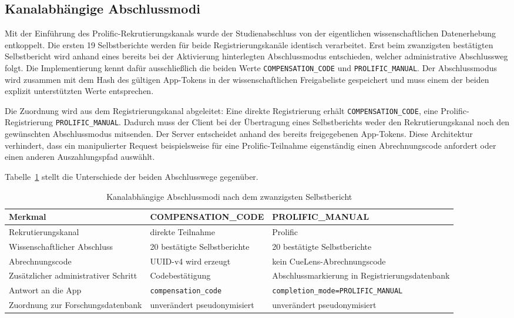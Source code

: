 
\begin{neu}
\section{Kanalabhängige Abschlussmodi}

Mit der Einführung des Prolific-Rekrutierungskanals wurde der Studienabschluss von der eigentlichen wissenschaftlichen Datenerhebung entkoppelt. Die ersten 19 Selbstberichte werden für beide Registrierungskanäle identisch verarbeitet. Erst beim zwanzigsten bestätigten Selbstbericht wird anhand eines bereits bei der Aktivierung hinterlegten Abschlussmodus entschieden, welcher administrative Abschlussweg folgt. Die Implementierung kennt dafür ausschließlich die beiden Werte \texttt{COMPENSATION\_CODE} und \texttt{PROLIFIC\_MANUAL}. Der Abschlussmodus wird zusammen mit dem Hash des gültigen App-Tokens in der wissenschaftlichen Freigabeliste gespeichert und muss einem der beiden explizit unterstützten Werte entsprechen.

Die Zuordnung wird aus dem Registrierungskanal abgeleitet: Eine direkte Registrierung erhält \texttt{COMPENSATION\_CODE}, eine Prolific-Registrierung \texttt{PROLIFIC\_MANUAL}. Dadurch muss der Client bei der Übertragung eines Selbstberichts weder den Rekrutierungskanal noch den gewünschten Abschlussmodus mitsenden. Der Server entscheidet anhand des bereits freigegebenen App-Tokens. Diese Architektur verhindert, dass ein manipulierter Request beispielsweise für eine Prolific-Teilnahme eigenständig einen Abrechnungscode anfordert oder einen anderen Auszahlungspfad auswählt.

Tabelle~\ref{tab:completion-modes} stellt die Unterschiede der beiden Abschlusswege gegenüber.

\begin{table}[htbp]
\centering
\caption{Kanalabhängige Abschlussmodi nach dem zwanzigsten Selbstbericht}
\label{tab:completion-modes}
\begin{tabular}{p{}p{}p{}}
\textbf{Merkmal} & \textbf{COMPENSATION\_CODE} & \textbf{PROLIFIC\_MANUAL} \\
\hline
Rekrutierungskanal & direkte Teilnahme & Prolific \\
Wissenschaftlicher Abschluss & 20 bestätigte Selbstberichte & 20 bestätigte Selbstberichte \\
Abrechnungscode & UUID-v4 wird erzeugt & kein CueLens-Abrechnungscode \\
Zusätzlicher administrativer Schritt & Codebestätigung & Abschlussmarkierung in Registrierungsdatenbank \\
Antwort an die App & \texttt{compensation\_code} & \texttt{completion\_mode=PROLIFIC\_MANUAL} \\
Zuordnung zur Forschungsdatenbank & unverändert pseudonymisiert & unverändert pseudonymisiert \\
\end{tabular}
\end{table}


\end{neu}
